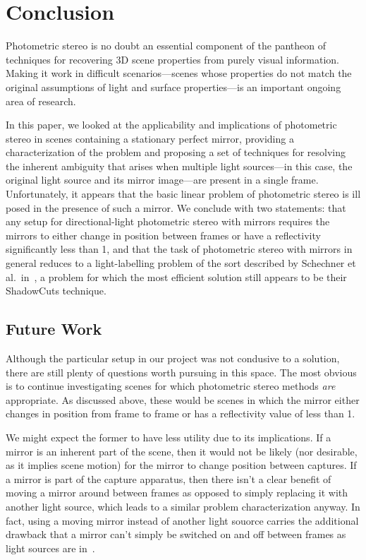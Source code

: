 \section{Conclusion}\label{sec:conclusion}
Photometric stereo is no doubt an essential component of the pantheon of
techniques for recovering 3D scene properties from purely visual information.
Making it work in difficult scenarios---scenes whose properties do not match
the original assumptions of light and surface properties---is an important
ongoing area of research.

In this paper, we looked at the applicability and implications of photometric
stereo in scenes containing a stationary perfect mirror, providing a
characterization of the problem and proposing a set of techniques for resolving
the inherent ambiguity that arises when multiple light sources---in this case,
the original light source and its mirror image---are present in a single frame.
Unfortunately, it appears that the basic linear problem of photometric stereo
is ill posed in the presence of such a mirror. We conclude with two statements:
that any setup for directional-light photometric stereo with mirrors requires
the mirrors to either change in position between frames or have a reflectivity
significantly less than 1, and that the task of photometric stereo with mirrors
in general reduces to a light-labelling problem of the sort described by
Schechner et al.\ in~\cite{schechner}, a problem for which the most efficient
solution still appears to be their ShadowCuts technique.
\subsection{Future Work}
Although the particular setup in our project was not condusive to a solution,
there are still plenty of questions worth pursuing in this space. The most
obvious is to continue investigating scenes for which photometric stereo
methods \emph{are} appropriate. As discussed above, these would be scenes in
which the mirror either changes in position from frame to frame or has a
reflectivity value of less than 1.

We might expect the former to have less utility due to its implications. If a
mirror is an inherent part of the scene, then it would not be likely (nor
desirable, as it implies scene motion) for the mirror to change position
between captures. If a mirror is part of the capture apparatus, then there
isn't a clear benefit of moving a mirror around between frames as opposed to
simply replacing it with another light source, which leads to a similar problem
characterization anyway. In fact, using a moving mirror instead of another
light souorce carries the additional drawback that a mirror can't simply be
switched on and off between frames as light sources are in~\cite{schechner}.


